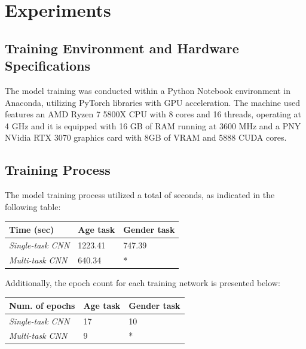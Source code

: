 \section{Experiments} \label{sec:experiments}

\subsection{Training Environment and Hardware Specifications}

The model training was conducted within a Python Notebook environment
in Anaconda, utilizing PyTorch libraries with GPU acceleration.
The machine used features an AMD Ryzen 7 5800X CPU with 8 cores and
16 threads, operating at 4 GHz and
it is equipped with 16 GB of RAM running at 3600 MHz
and a PNY NVidia RTX 3070 graphics card with 8GB
of VRAM and 5888 CUDA cores.

\subsection{Training Process}

The model training process utilized a total of seconds,
as indicated in the following table:
\begin{table}[H]
    \centering
    \begin{tabular}{@{}lll@{}}
    \toprule
    Time (sec)               & \textbf{Age task} & \textbf{Gender task} \\ \midrule
    \textit{Single-task CNN} &  1223.41          & 747.39               \\
    \textit{Multi-task CNN}  &  640.34           & *                    \\ \bottomrule
    \end{tabular}
\end{table}

Additionally, the epoch count for each training network is presented below:
\begin{table}[H]
    \centering
    \begin{tabular}{@{}lll@{}}
    \toprule
    Num. of epochs           & \textbf{Age task} & \textbf{Gender task} \\ \midrule
    \textit{Single-task CNN} & 17                & 10                   \\
    \textit{Multi-task CNN}  & 9                 & *                    \\ \bottomrule
    \end{tabular}
\end{table}

